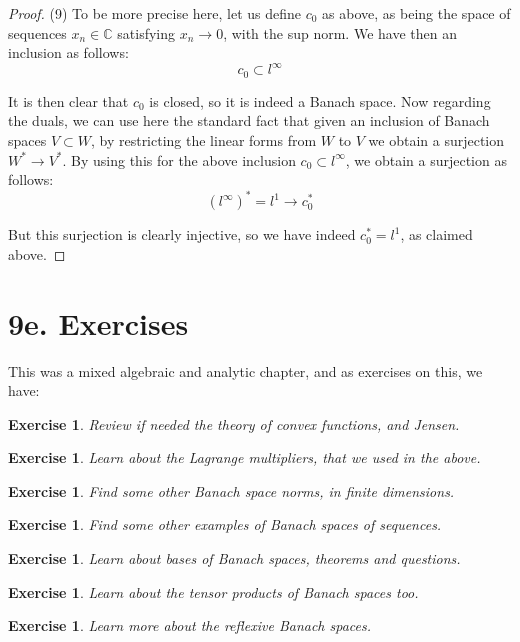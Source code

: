 \documentclass[12pt]{amsbook}
\newtheorem{exercise}[theorem]{Exercise}
\begin{document}
\begin{proof}
\medskip

(9) To be more precise here, let us define  $c_0$ as above, as being the space of sequences $x_n\in\mathbb C$ satisfying $x_n\to0$, with the sup norm. We have then an inclusion as follows:
$$c_0\subset l^\infty$$

It is then clear that $c_0$ is closed, so it is indeed a Banach space. Now regarding the duals, we can use here the standard fact that given an inclusion of Banach spaces $V\subset W$, by restricting the linear forms from $W$ to $V$ we obtain a surjection $W^*\to V^*$. By using this for the above inclusion $c_0\subset l^\infty$, we obtain a surjection as follows:
$$(l^\infty)^*=l^1\to c_0^*$$

But this surjection is clearly injective, so we have indeed $c_0^*=l^1$, as claimed above.
\end{proof}

\section*{9e. Exercises}

This was a mixed algebraic and analytic chapter, and as exercises on this, we have:

\begin{exercise}
Review if needed the theory of convex functions, and Jensen.
\end{exercise}

\begin{exercise}
Learn about the Lagrange multipliers, that we used in the above.
\end{exercise}

\begin{exercise}
Find some other Banach space norms, in finite dimensions.
\end{exercise}

\begin{exercise}
Find some other examples of Banach spaces of sequences.
\end{exercise}

\begin{exercise}
Learn about bases of Banach spaces, theorems and questions.
\end{exercise}

\begin{exercise}
Learn about the tensor products of Banach spaces too.
\end{exercise}

\begin{exercise}
Learn more about the reflexive Banach spaces.
\end{exercise}
\end{document}
